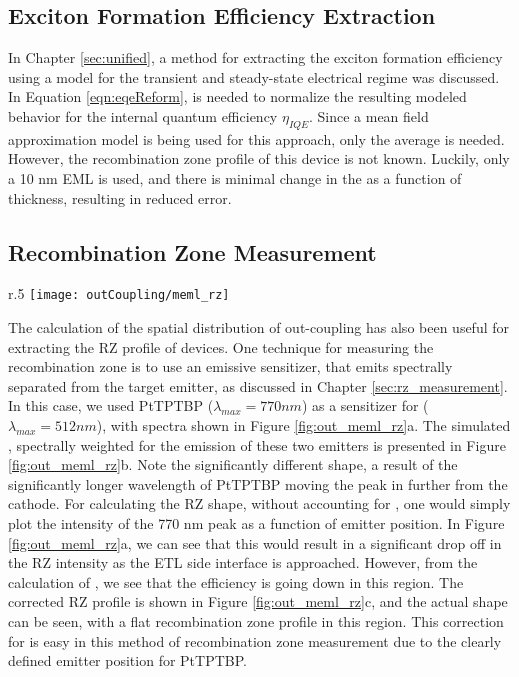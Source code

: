 \documentclass[../thesis.tex]{subfiles}
\begin{document}
\subsection{Exciton Formation Efficiency Extraction}

In Chapter \ref{sec:unified}, a method for extracting the exciton formation efficiency using a model for the transient and steady-state electrical regime was discussed.
In Equation \ref{eqn:eqeReform}, \oc is needed to normalize the resulting modeled behavior for the internal quantum efficiency $\eta_{IQE}$.  
Since a mean field approximation model is being used for this approach, only the average \oc is needed.
However, the recombination zone profile of this device is not known.  
Luckily, only a 10 nm EML is used, and there is minimal change in the \oc as a function of thickness, resulting in reduced error.

\subsection{Recombination Zone Measurement}

\begin{wrapfigure}{r}{.5\textwidth}
\centering
\texttt{[image: outCoupling/meml\_rz]}
\caption{(a) Raw electroluminescence spectra of devices with PtTPTBP sensitizer. (b) simulated electric field profile and out-coupling factors at 512 nm and 770 nm. (c) Out-coupling corrected RZ profile. Reproduced from \textcite{Bangsund2018}.}
\label{fig:out_meml_rz}
\end{wrapfigure}

The calculation of the spatial distribution of out-coupling has also been useful for extracting the RZ profile of devices.\supercite{Bangsund2018}
One technique for measuring the recombination zone is to use an emissive sensitizer, that emits spectrally separated from the target emitter, as discussed in Chapter \ref{sec:rz_measurement}.
In this case, we used PtTPTBP ($\lambda_{max}=770 nm$) as a sensitizer for \irppy ($\lambda_{max}=512 nm$), with spectra shown in Figure \ref{fig:out_meml_rz}a.
The simulated \oc, spectrally weighted for the emission of these two emitters is presented in Figure \ref{fig:out_meml_rz}b.
Note the significantly different shape, a result of the significantly longer wavelength of PtTPTBP moving the peak in \oc further from the cathode.
For calculating the RZ shape, without accounting for \oc, one would simply plot the intensity of the 770 nm peak as a function of emitter position.
In Figure \ref{fig:out_meml_rz}a, we can see that this would result in a significant drop off in the RZ intensity as the ETL side interface is approached.
However, from the calculation of \oc, we see that the efficiency is going down in this region.  
The corrected RZ profile is shown in Figure \ref{fig:out_meml_rz}c, and the actual shape can be seen, with a flat recombination zone profile in this region.
This correction for \oc is easy in this method of recombination zone measurement due to the clearly defined emitter position for PtTPTBP.
\end{document}
